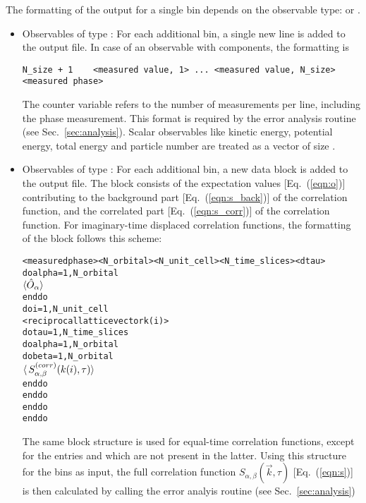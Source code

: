 The formatting of the output for a single bin depends on the observable type:  or .
\begin{itemize}
\item Observables of type :
For each additional bin, a single new line is added to the output file.
In case of an observable with  components, the formatting is 
\begin{verbatim}
N_size + 1    <measured value, 1> ... <measured value, N_size>    <measured phase>
\end{verbatim}
The counter variable  refers to the number of measurements per line, including the phase measurement. 
This format is required by the error analysis routine (see Sec.~\ref{sec:analysis}). 
Scalar observables like kinetic energy, potential energy, total energy and particle number are treated as a vector 
of size .

\item Observables of type :
For each additional bin, a new data block is added to the output file. 
The block consists of the expectation values [Eq.~(\ref{eqn:o})] contributing to the background part [Eq.~(\ref{eqn:s_back})] of the correlation function,
and the correlated part [Eq.~(\ref{eqn:s_corr})] of the correlation function.
For imaginary-time displaced correlation functions, the formatting of the block follows this scheme:
\begin{alltt}
<measured phase>  <N_orbital>  <N_unit_cell> <N_time_slices> <dtau>
do alpha = 1, N_orbital
    \(\langle\hat{O}\sb{\alpha}\rangle \)
enddo
do i = 1, N_unit_cell
   <reciprocal lattice vector k(i)>
   do tau = 1, N_time_slices
      do alpha = 1, N_orbital
         do beta = 1, N_orbital
            \(\langle\,S\sb{\alpha,\beta}\sp{(corr)}(k(i),\tau)\rangle\)
         enddo
      enddo
   enddo
enddo
\end{alltt}
The same block structure is used for equal-time correlation functions, except for the entries   and  
which are not present in the latter.
Using this structure for the bins as input,
the full correlation function $S_{\alpha,\beta}(\vec{k},\tau)$ [Eq.~(\ref{eqn:s})] is then calculated by calling the error analyis routine (see Sec.~\ref{sec:analysis})
\end{itemize}

